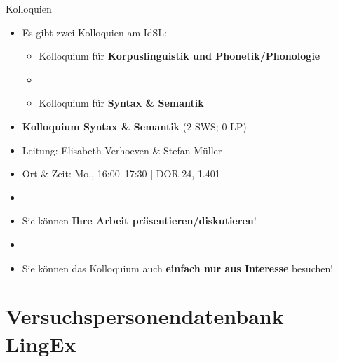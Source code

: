 \begin{frame}{Kolloquien}

\begin{itemize}
	\item Es gibt zwei Kolloquien am IdSL:

	\begin{itemize}
		\item Kolloquium für \textbf{Korpuslinguistik und Phonetik/Phonologie}
		\item[]

		\item Kolloquium für \textbf{Syntax \& Semantik}
	\end{itemize}

	\item \textbf{Kolloquium Syntax \& Semantik} (2 SWS; 0 LP)
	
	\item[] Leitung: Elisabeth Verhoeven \& Stefan Müller
	
	\item[] Ort \& Zeit: Mo., 16:00--17:30 $|$ DOR 24, 1.401 
	
	\item[]
	\item Sie können \textbf{Ihre Arbeit präsentieren/diskutieren}!

	\item[]
	\item Sie können das Kolloquium auch \textbf{einfach nur aus Interesse} besuchen!
\end{itemize}		

\end{frame}


\section{Versuchspersonendatenbank LingEx}

